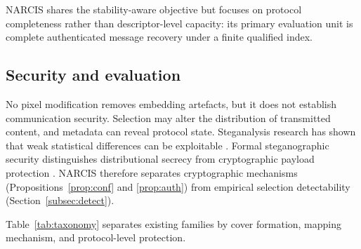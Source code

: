 \documentclass[10pt,journal]{IEEEtran}
\newcommand{\method}{NARCIS\xspace}
\begin{document}
\method shares the stability-aware objective but focuses on protocol
completeness rather than descriptor-level capacity: its primary
evaluation unit is complete authenticated message recovery under a
finite qualified index.

\subsection{Security and evaluation}

No pixel modification removes embedding artefacts, but it does not
establish communication security. Selection may alter the distribution
of transmitted content, and metadata can reveal protocol state.
Steganalysis research has shown that weak statistical differences can
be exploitable \cite{fridrich2012rich,holub2014uniward,
xu2016steganalysis,ye2017steganalysis,yedroudj2018net,
boroumand2018srnet}. Formal steganographic security distinguishes
distributional secrecy from cryptographic payload protection
\cite{cachin1998steganography}. \method therefore separates
cryptographic mechanisms (Propositions~\ref{prop:conf} and
\ref{prop:auth}) from empirical selection detectability
(Section~\ref{subsec:detect}).

Table~\ref{tab:taxonomy} separates existing families by cover
formation, mapping mechanism, and protocol-level protection.
\end{document}
